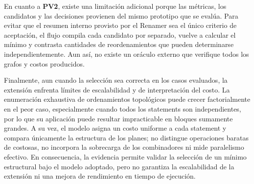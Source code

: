 En cuanto a \textbf{PV2}, existe una limitación adicional porque las métricas, los candidatos y las decisiones provienen del mismo prototipo que se evalúa. Para evitar que el resumen interno provisto por el Renamer sea el único criterio de aceptación, el flujo compila cada candidato por separado, vuelve a calcular el mínimo y contrasta cantidades de reordenamientos que pueden determinarse independientemente. Aun así, no existe un oráculo externo que verifique todos los grafos y costos producidos.

Finalmente, aun cuando la selección sea correcta en los casos evaluados, la extensión enfrenta límites de escalabilidad y de interpretación del costo. La enumeración exhaustiva de ordenamientos topológicos puede crecer factorialmente en el peor caso, especialmente cuando todos los statements son independientes, por lo que su aplicación puede resultar impracticable en bloques sumamente grandes. A su vez, el modelo asigna un costo uniforme a cada statement y compara únicamente la estructura de los planes; no distingue operaciones baratas de costosas, no incorpora la sobrecarga de los combinadores ni mide paralelismo efectivo. En consecuencia, la evidencia permite validar la selección de un mínimo estructural bajo el modelo adoptado, pero no garantiza la escalabilidad de la extensión ni una mejora de rendimiento en tiempo de ejecución.
